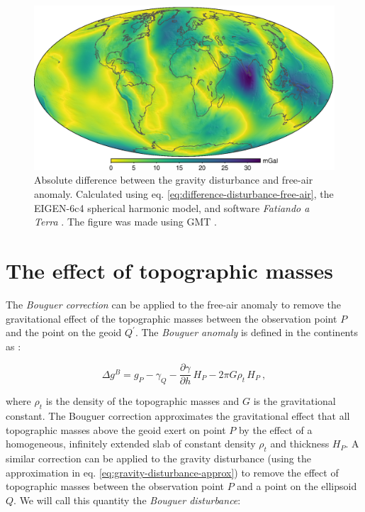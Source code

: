 \documentclass[extra]{gji}
\begin{document}
\begin{figure}
    \includegraphics[width=\columnwidth]{figures/difference.eps}
    \caption{
    Absolute difference between the gravity disturbance and free-air anomaly.
    Calculated using eq. \ref{eq:difference-disturbance-free-air}, the
    EIGEN-6c4 \citep{forste2014} spherical harmonic model, and software
    \textit{Fatiando a Terra} \citep{uieda2013}. The figure was made using GMT
    \citep{wessel2013}.
    }
  \label{fig:difference}
\end{figure}


\section{The effect of topographic masses}

The \textit{Bouguer correction} can be applied to the free-air anomaly
to remove the gravitational effect of the topographic masses
between the observation point $P$ and the point on the geoid $Q^\prime$.
The \textit{Bouguer anomaly} is defined in the continents as
\citep{blakely1996, hofmann-wellenhof-moritz2005}:

\begin{equation}
\Delta g^{B} = g_{P}
    - \gamma_{Q}
    - \frac{\partial \gamma}{\partial h} \, H_{P}
    - 2 \pi G \rho_{t} \, H_{P}
     \: ,
\label{eq:simple-bouguer-anomaly}
\end{equation}

\noindent
where $\rho_t$ is the density of the topographic masses and $G$ is the
gravitational constant.
The Bouguer correction approximates the gravitational effect that all
topographic masses above the geoid exert on point $P$ by the effect of a
homogeneous, infinitely extended slab of constant density $\rho_{t}$ and
thickness $H_{P}$.
A similar correction can be applied to the gravity disturbance
(using the approximation in eq. \ref{eq:gravity-disturbance-approx})
to remove the effect of topographic masses between
the observation point $P$ and a point on the ellipsoid $Q$.
We will call this quantity the \textit{Bouguer disturbance}:
\end{document}
